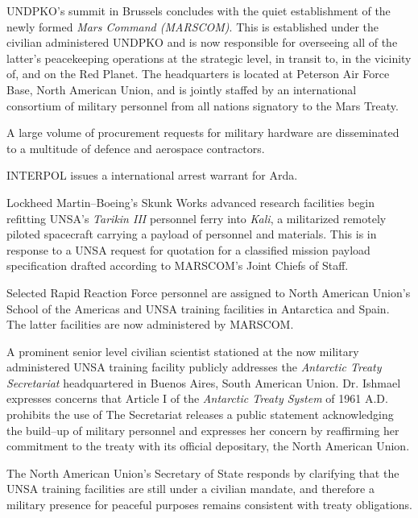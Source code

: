 UNDPKO's summit in Brussels concludes with the quiet establishment of the newly formed {\it Mars Command (MARSCOM)}. This is established under the civilian administered UNDPKO and is now responsible for overseeing all of the latter's peacekeeping operations at the strategic level, in transit to, in the vicinity of, and on the Red Planet. The headquarters is located at Peterson Air Force Base, North American Union, and is jointly staffed by an international consortium of military personnel from all nations signatory to the Mars Treaty.

A large volume of procurement requests for military hardware are disseminated to a multitude of defence and aerospace contractors.
\StopTimelineDate

INTERPOL issues a  international arrest warrant for Arda.
\StopTimelineDate

Lockheed Martin--Boeing's Skunk Works advanced research facilities begin refitting UNSA's {\it Tarikin III} personnel ferry into {\it Kali}, a militarized remotely piloted spacecraft carrying a payload of personnel and materials. This is in response to a UNSA request for quotation for a classified mission payload specification drafted according to MARSCOM's Joint Chiefs of Staff.
\StopTimelineDate

Selected Rapid Reaction Force personnel are assigned to North American Union's School of the Americas and UNSA training facilities in Antarctica and Spain. The latter facilities are now administered by MARSCOM.

A prominent senior level civilian scientist stationed at the now military administered UNSA training facility publicly addresses the {\it Antarctic Treaty Secretariat} headquartered in Buenos Aires, South American Union. Dr. Ishmael expresses concerns that Article I of the {\it Antarctic Treaty System} of 1961 A.D. prohibits the use of  The Secretariat releases a public statement acknowledging the build--up of military personnel and expresses her concern by reaffirming her commitment to the treaty with its official depositary, the North American Union.

The North American Union's Secretary of State responds by clarifying that the UNSA training facilities are still under a civilian mandate, and therefore a military presence for peaceful purposes remains consistent with treaty obligations.
\StopTimelineDate

